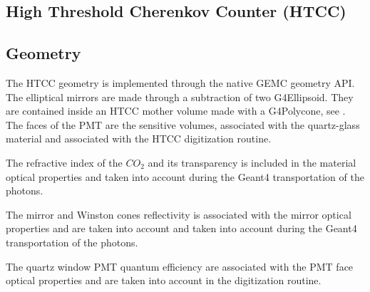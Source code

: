 \subsection{High Threshold Cherenkov Counter (HTCC)}

\subsection{Geometry}

The HTCC geometry is implemented through the native GEMC geometry API. The elliptical mirrors are made through a subtraction of
two G4Ellipsoid. They are contained inside an HTCC mother volume made with a G4Polycone, see .
The faces of the PMT are the sensitive volumes, associated with the quartz-glass material and associated with the HTCC digitization routine.

The refractive index of the $CO_2$ and its transparency is included in the material optical properties and taken
into account during the Geant4 transportation of the photons.

The mirror and Winston cones reflectivity is associated with the mirror optical properties and are taken into
account and taken into account during the Geant4 transportation of the photons.

The quartz window PMT quantum efficiency are associated with the PMT face optical properties and are taken into account in
the digitization routine.


